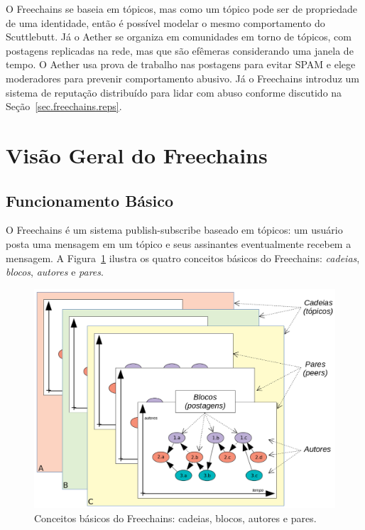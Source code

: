 \documentclass[12pt]{article}
\newcommand{\FC} {Freechains\xspace}
\begin{document}
O \FC se baseia em tópicos, mas como um tópico pode ser de propriedade de uma
identidade, então é possível modelar o mesmo comportamento do Scuttlebutt.
Já o Aether se organiza em comunidades em torno de tópicos, com postagens
replicadas na rede, mas que são efêmeras considerando uma janela de tempo.
O Aether usa prova de trabalho nas postagens para evitar SPAM e elege
moderadores para prevenir comportamento abusivo.
Já o \FC introduz um sistema de reputação distribuído para lidar com abuso
conforme discutido na Seção~\ref{sec.freechains.reps}.

\section{Visão Geral do \FC}
\label{sec.freechains}

\subsection{Funcionamento Básico}

O \FC é um sistema publish-subscribe baseado em tópicos: um usuário
posta uma mensagem em um tópico e seus assinantes eventualmente recebem a
mensagem.
A Figura~\ref{fig.all} ilustra os quatro conceitos básicos do \FC:
\emph{cadeias}, \emph{blocos}, \emph{autores} e \emph{pares}.

\begin{figure}[ht]
\centering
\includegraphics[width=.65\textwidth]{all1.png}
\caption{\scriptsize{Conceitos básicos do \FC: cadeias, blocos, autores e pares.}}
\label{fig.all}
\end{figure}
\end{document}
